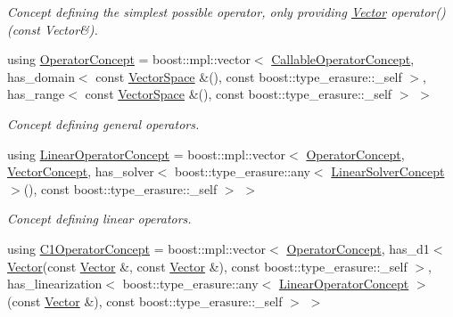 \begin{DoxyCompactItemize}
\begin{DoxyCompactList}\small\item\em Concept defining the simplest possible operator, only providing \hyperlink{classSpacy_1_1Vector}{Vector} operator()(const Vector\&). \end{DoxyCompactList}\item 
using \hyperlink{group__ConceptGroup_ga7d984281b647a6d8e4c0a7ea5faeb90e_ga7d984281b647a6d8e4c0a7ea5faeb90e}{Operator\+Concept} = boost\+::mpl\+::vector$<$ \hyperlink{group__ConceptGroup_gadec0c664abaacc2065dadd8b11cc8d30_gadec0c664abaacc2065dadd8b11cc8d30}{Callable\+Operator\+Concept}, has\+\_\+domain$<$ const \hyperlink{classSpacy_1_1VectorSpace}{Vector\+Space} \&(), const boost\+::type\+\_\+erasure\+::\+\_\+self $>$, has\+\_\+range$<$ const \hyperlink{classSpacy_1_1VectorSpace}{Vector\+Space} \&(), const boost\+::type\+\_\+erasure\+::\+\_\+self $>$ $>$
\begin{DoxyCompactList}\small\item\em Concept defining general operators. \end{DoxyCompactList}\item 
using \hyperlink{group__ConceptGroup_gaf0e18e41c434cfceb77ccb8e785a8055_gaf0e18e41c434cfceb77ccb8e785a8055}{Linear\+Operator\+Concept} = boost\+::mpl\+::vector$<$ \hyperlink{group__ConceptGroup_ga7d984281b647a6d8e4c0a7ea5faeb90e_ga7d984281b647a6d8e4c0a7ea5faeb90e}{Operator\+Concept}, \hyperlink{group__ConceptGroup_gad6958389d1fa2758a8a64a0a24c36004_gad6958389d1fa2758a8a64a0a24c36004}{Vector\+Concept}, has\+\_\+solver$<$ boost\+::type\+\_\+erasure\+::any$<$ \hyperlink{group__ConceptGroup_gac7d6a94c7131c8613e2ab26fddeb50bd_gac7d6a94c7131c8613e2ab26fddeb50bd}{Linear\+Solver\+Concept} $>$(), const boost\+::type\+\_\+erasure\+::\+\_\+self $>$ $>$
\begin{DoxyCompactList}\small\item\em Concept defining linear operators. \end{DoxyCompactList}\item 
using \hyperlink{group__ConceptGroup_ga14a12c741dc237e32862fa4bc315451b_ga14a12c741dc237e32862fa4bc315451b}{C1\+Operator\+Concept} = boost\+::mpl\+::vector$<$ \hyperlink{group__ConceptGroup_ga7d984281b647a6d8e4c0a7ea5faeb90e_ga7d984281b647a6d8e4c0a7ea5faeb90e}{Operator\+Concept}, has\+\_\+d1$<$ \hyperlink{classSpacy_1_1Vector}{Vector}(const \hyperlink{classSpacy_1_1Vector}{Vector} \&, const \hyperlink{classSpacy_1_1Vector}{Vector} \&), const boost\+::type\+\_\+erasure\+::\+\_\+self $>$, has\+\_\+linearization$<$ boost\+::type\+\_\+erasure\+::any$<$ \hyperlink{group__ConceptGroup_gaf0e18e41c434cfceb77ccb8e785a8055_gaf0e18e41c434cfceb77ccb8e785a8055}{Linear\+Operator\+Concept} $>$(const \hyperlink{classSpacy_1_1Vector}{Vector} \&), const boost\+::type\+\_\+erasure\+::\+\_\+self $>$ $>$

\end{DoxyCompactItemize}
